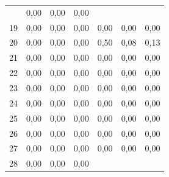 \begin{table}[ht]
\begin{tabular}{l|c|c|c|c|c|c}
              & 0,00                                   & 0,00                                      & 0,00
        \\
        19    & 0,00                                   & 0,00                                      & 0,00
              & 0,00                                   & 0,00                                      & 0,00
        \\
        20    & 0,00                                   & 0,00                                      & 0,00
              & 0,50                                   & 0,08                                      & 0,13
        \\
        21    & 0,00                                   & 0,00                                      & 0,00
              & 0,00                                   & 0,00                                      & 0,00
        \\
        22    & 0,00                                   & 0,00                                      & 0,00
              & 0,00                                   & 0,00                                      & 0,00
        \\
        23    & 0,00                                   & 0,00                                      & 0,00
              & 0,00                                   & 0,00                                      & 0,00
        \\
        24    & 0,00                                   & 0,00                                      & 0,00
              & 0,00                                   & 0,00                                      & 0,00
        \\
        25    & 0,00                                   & 0,00                                      & 0,00
              & 0,00                                   & 0,00                                      & 0,00
        \\
        26    & 0,00                                   & 0,00                                      & 0,00
              & 0,00                                   & 0,00                                      & 0,00
        \\
        27    & 0,00                                   & 0,00                                      & 0,00
              & 0,00                                   & 0,00                                      & 0,00
        \\
        28    & 0,00                                   & 0,00                                      & 0,00

\end{tabular}
\end{table}
